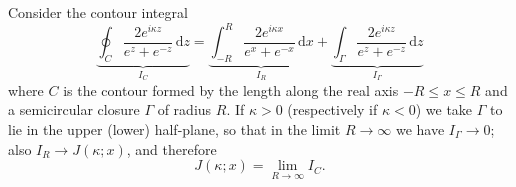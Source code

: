\documentclass[11pt,a4paper]{article}
\begin{document}
Consider the contour integral
\begin{equation*}
	\underbrace{\oint_C    		\frac{2e^{i\kappa z}}{e^z+e^{-z}}  \,\mathrm{d}z}_{I_C} =
	\underbrace{\int_{-R}^R     \frac{2e^{i\kappa x}}{e^x+e^{-x}}  \,\mathrm{d}x}_{I_R} +
	\underbrace{\int_\Gamma  \frac{2e^{i\kappa z}}{e^z+e^{-z}}  \,\mathrm{d}z}_{I_\Gamma}
\end{equation*}
where $C$ is the contour formed by the length along the real axis $-R \leq x \leq R$ and a semicircular closure $\Gamma$ of radius $R$. If $\kappa>0$ (respectively if $\kappa<0$) we take $\Gamma$ to lie in the upper (lower) half-plane, so that in the limit $R\to\infty$ we have $I_\Gamma\to0$; also
$I_R\to J(\kappa;x)$, and therefore
\begin{equation*}
	J(\kappa ; x) = \lim_{R\to\infty} I_C.
\end{equation*}
\end{document}
